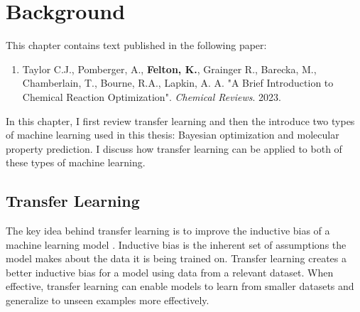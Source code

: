 \chapter{Background}\label{ch:background}

This chapter contains text published in the following paper:

\begin{enumerate}
\item Taylor C.J., Pomberger, A., \textbf{Felton, K.}, Grainger R., Barecka, M., Chamberlain, T., Bourne, R.A., Lapkin, A. A. "A Brief Introduction to Chemical Reaction Optimization". \textit{Chemical Reviews}. 2023.
\end{enumerate}

In this chapter, I first review transfer learning and then the introduce two types of machine learning used in this thesis: Bayesian optimization and molecular property prediction. I discuss how transfer learning can be applied to both of these types of machine learning.

\section{Transfer Learning}

The key idea behind transfer learning is to improve the inductive bias of a machine learning model \cite{Zhuang2021}. Inductive bias is the inherent set of assumptions the model makes about the data it is being trained on. Transfer learning creates a better inductive bias for a model using data from a relevant dataset. When effective, transfer learning can enable models to learn from smaller datasets and generalize to unseen examples more effectively. 

